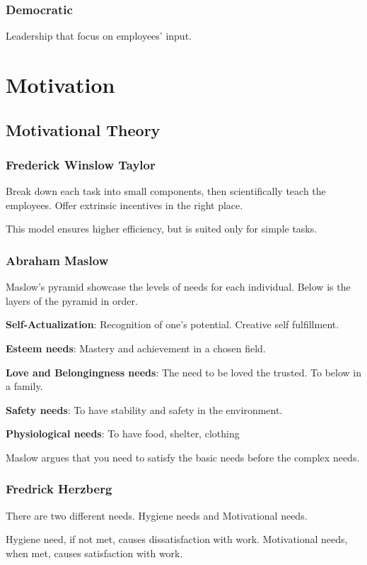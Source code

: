 \documentclass{standalone}
\begin{document}
\subsubsection{Democratic}
Leadership that focus on employees' input.

\section{Motivation}

\subsection{Motivational Theory}

\subsubsection{Frederick Winslow Taylor}
Break down each task into small components, then scientifically teach the employees.
Offer extrinsic incentives in the right place.

This model ensures higher efficiency, but is suited only for simple tasks.

\subsubsection{Abraham Maslow}
Maslow's pyramid showcase the levels of needs for each individual.
Below is the layers of the pyramid in order.

\textbf{Self-Actualization}: Recognition of one's potential.
Creative self fulfillment.

\textbf{Esteem needs}: Mastery and achievement in a chosen field.

\textbf{Love and Belongingness needs}: The need to be loved the trusted. 
To below in a family.

\textbf{Safety needs}: To have stability and safety in the environment.

\textbf{Physiological needs}: To have food, shelter, clothing

Maslow argues that you need to satisfy the basic needs before the complex needs.

\subsubsection{Fredrick Herzberg}
There are two different needs.
Hygiene needs and Motivational needs.

Hygiene need, if not met, causes dissatisfaction with work.
Motivational needs, when met, causes satisfaction with work.
\end{document}
